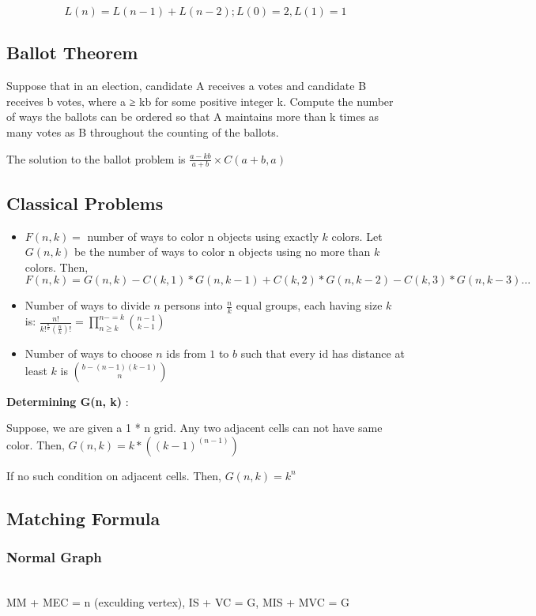 {$$ L(n) = L(n-1) + L(n-2); L(0)=2, L(1)=1 $$

\subsection{Ballot Theorem}

Suppose that in an election, candidate A receives
a votes and candidate B receives b votes, where a ≥ kb for some positive
integer k. Compute the number of ways the ballots can be ordered so that
A maintains more than k times as many votes as B throughout the counting
of the ballots.

The solution to the ballot problem is $\frac{a - kb}{a+b} \times C(a + b, a)$

\subsection{Classical Problems}

\begin{itemize}[leftmargin=*, noitemsep]
  \item $ F(n, k) = $ number of ways to color n objects using exactly $ k $ colors. Let $ G(n, k) $ be the number of ways to color n objects using no more than $ k $ colors. Then, $ F(n, k) = G(n, k) - C(k, 1) * G(n, k-1) + C(k, 2) * G(n, k-2) - C(k, 3) * G(n, k-3) ... $
  \item Number of ways to divide $n$ persons into $\frac{n}{k}$ equal groups, each having size $k$ is:
  $\frac{n!}{k!^{\frac{n}{k}} \left( \frac{n}{k} \right)!} = \prod_{n \geq k}^{n -= k} \binom{n-1}{k-1}$
  \item Number of ways to choose $n$ ids from  $1$ to $b$ such that every id has distance at least $k$ is $\binom{b - (n-1)(k-1)}{n}$
\end{itemize}

\textbf{Determining G(n, k)} :

Suppose, we are given a 1 * n grid. Any two adjacent cells can not have same color.
Then, $G(n, k) = k * ((k-1)^(n-1))$

If no such condition on adjacent cells.
Then, $G(n, k) = k ^ n$

\subsection{Matching Formula}

\subsubsection{Normal Graph} \\
MM + MEC = n (exculding vertex), IS + VC = G, MIS + MVC = G \\

}
